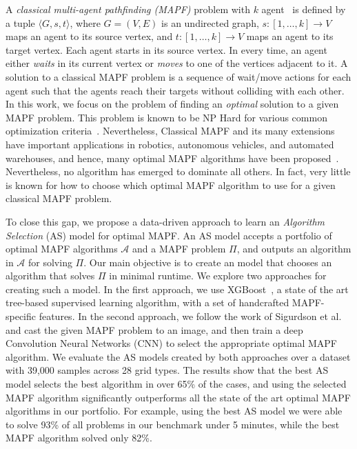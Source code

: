 \documentclass[letterpaper]{article} %
\begin{document}
A \emph{classical multi-agent pathfinding (MAPF)} problem with $k$ agent~\cite{stern2019multiagent} is defined by a tuple $\langle G,s,t \rangle$, where $G = (V,E)$ is an undirected graph, 
$s: [1,\ldots,k] \rightarrow V$ maps an agent to its source vertex, 
and $t: [1,\ldots,k] \rightarrow V$ maps an agent to its target vertex. 
Each agent starts in its source vertex. In every time, an agent either \emph{waits} in its current vertex or \emph{moves} to one of the vertices adjacent to it. 
A solution to a classical MAPF problem is a sequence of wait/move actions for each agent such that the agents reach their targets without colliding with each other. 
In this work, we focus on the problem of finding an \emph{optimal} solution to a given MAPF problem. 
This problem is known to be NP Hard for various common optimization criteria~\cite{DBLP:conf/aaai/Surynek10,DBLP:conf/aaai/YuL13}. Nevertheless, Classical MAPF and its many extensions have important applications in robotics, autonomous vehicles, and automated warehouses, 
and hence, many optimal MAPF algorithms have been proposed~\cite{felner2017search,ma2017buzz}. 
Nevertheless, no algorithm has emerged to dominate all others. 
In fact, very little is known for how to choose which optimal MAPF algorithm to use for a given classical MAPF problem. 


To close this gap, we propose a data-driven approach to learn an \emph{Algorithm Selection} (AS) model for optimal MAPF. 
An AS model accepts a portfolio of optimal MAPF algorithms $\mathcal{A}$ and 
a MAPF problem $\Pi$, and outputs an algorithm in $\mathcal{A}$ for solving $\Pi$. Our main objective is to create an \AS model that chooses an algorithm that solves $\Pi$ in minimal runtime. 
We explore two approaches for creating such a model. 
In the first approach, we use XGBoost~, a state of the art tree-based supervised learning algorithm, with a set of handcrafted MAPF-specific features. In the second approach, we follow the work of Sigurdson et al.~\cite{sigurdson2019deep} and cast the given MAPF problem to an image, and then train a deep Convolution Neural Networks (CNN) to select the appropriate optimal MAPF algorithm. We evaluate the AS models created by both approaches over a dataset with 39,000 samples across 28 grid types. 
The results show that the best AS model selects the best algorithm in over 65\% of the cases, and using the selected MAPF algorithm significantly outperforms all the state of the art optimal MAPF algorithms in our portfolio. For example, using the best AS model we were able to solve 93\% of all problems in our benchmark under 5 minutes, while the best MAPF algorithm solved only 82\%. 
\end{document}
